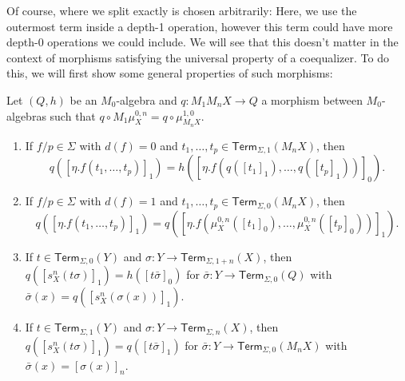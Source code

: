\documentclass[a4paper,UKenglish,cleveref,thm-restate,numberwithinsect,final]{lipics-v2021}
\newcommand{\Term}{\mathsf{Term}}
\newcommand{\sig}{\Sigma}
\theoremstyle{plain}
\numberwithin{equation}{section}
\newcommand{\+}[1]{\mathcal{#1}\xspace}
\theoremstyle{definition}
\begin{document}
Of course, where we split exactly is chosen arbitrarily:
Here, we use the outermost term inside a depth-1 operation, however this term could have more depth-0 operations we could include.
We will see that this doesn't matter in the context of morphisms satisfying the universal property of a coequalizer.
To do this, we will first show some general properties of such morphisms:
\begin{lemma}\label{thm:coequalizerproperties}
    Let \((Q, h)\) be an \(M_0\)-algebra and \(q: M_1 M_n X \to Q\) a morphism between \(M_0\)-algebras such that \(q \circ M_1 \mu^{0, n}_X = q \circ \mu^{1, 0}_{M_n X}\).
    \begin{enumerate}
        \item \label{itm:coequalizerpropertiesdepth0}
            If \(f/p \in \sig\) with \(d(f) = 0\) and \(t_1, \ldots, t_p \in \Term_{\sig, 1}(M_n X)\), then
            \begin{equation*}
                q([\eta.f(t_1, \ldots, t_p)]_1) = h([\eta.f(q([t_1]_1), \ldots, q([t_p]_1))]_0).
            \end{equation*}
        \item \label{itm:coequalizerpropertiesdepth1}
            If \(f/p \in \sig\) with \(d(f) = 1\) and \(t_1, \ldots, t_p \in \Term_{\sig, 0}(M_n X)\), then
            \begin{equation*}
                q([\eta.f(t_1, \ldots, t_p)]_1) = q([\eta.f(\mu^{0, n}_X([t_1]_0), \ldots, \mu^{0, n}_X([t_p]_0))]_1).
            \end{equation*}
        \item \label{itm:substitutionlemmadepth0}
            If \(t \in \Term_{\sig, 0}(Y)\) and \(\sigma: Y \to \Term_{\sig, 1 + n}(X)\), then \(q([s^n_X(t\sigma)]_1) = h([t\bar{\sigma}]_0)\) for \(\bar{\sigma}: Y \to \Term_{\sig, 0}(Q)\) with \(\bar{\sigma}(x) = q([s^n_X(\sigma(x))]_1)\).
        \item \label{itm:substitutionlemmadepth1}
            If \(t \in \Term_{\sig, 1}(Y)\) and \(\sigma: Y \to \Term_{\sig, n}(X)\), then \(q([s^n_X(t\sigma)]_1) = q([t\bar{\sigma}]_1)\) for \(\bar{\sigma}: Y \to \Term_{\sig, 0}(M_n X)\) with \(\bar{\sigma}(x) = [\sigma(x)]_n\).
    \end{enumerate}
\end{lemma}
\end{document}
